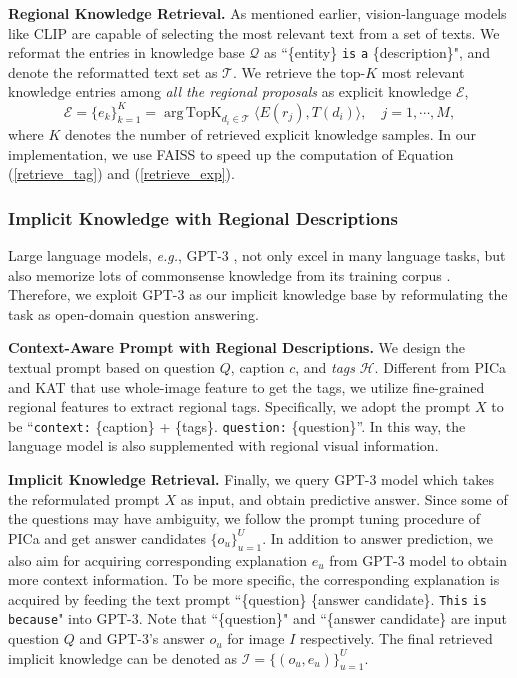 \documentclass{article}
\DeclareMathOperator*{\argtopk}{arg\,TopK}
\begin{document}
\textbf{Regional Knowledge Retrieval. } 
As mentioned earlier, vision-language models like CLIP are capable of selecting the most relevant text from a set of texts. We reformat the entries in knowledge base $\mathcal{Q}$ as ``\{entity\} \texttt{is} \texttt{a} \{description\}", and denote the reformatted text set as $\mathcal{T}$. 
We retrieve the top-$K$ most relevant knowledge entries among \emph{all the regional proposals} as explicit knowledge $\mathcal{E}$,  
\begin{equation}
    \label{retrieve_exp}
     \mathcal{E} = \{e_{k}\}_{k=1}^K= \argtopk_{d_i\in \mathcal{T}}  \langle E(r_j), T(d_i) \rangle, \quad j=1, \cdots, M,
\end{equation}
where $K$ denotes the number of retrieved explicit knowledge samples. In our implementation, we use FAISS \cite{johnson2019billion} to speed up the computation of Equation (\ref{retrieve_tag}) and (\ref{retrieve_exp}).

\subsubsection{Implicit Knowledge with Regional Descriptions}
Large language models, \textit{e.g.}, GPT-3 \cite{brown2020language}, not only excel in many language tasks, but also memorize lots of commonsense knowledge from its training corpus \cite{yang2021empirical}. Therefore, we exploit GPT-3 \cite{brown2020language} as our implicit knowledge base by reformulating the task as open-domain question answering.

\textbf{Context-Aware Prompt with Regional Descriptions. }  We design the textual prompt based on question $Q$, caption $c$, and \emph{tags} $\mathcal{H}$. Different from PICa \cite{yang2021empirical} and KAT \cite{gui2021kat} that use whole-image feature to get the tags, we utilize fine-grained regional features to extract regional tags. Specifically, we adopt the prompt $X$ to be ``\texttt{context:} \{caption\} + \{tags\}. \texttt{question:} \{question\}''. In this way, the language model is also supplemented with regional visual information.


\textbf{Implicit Knowledge Retrieval. } Finally, we query GPT-3 model \cite{brown2020language} which takes the reformulated prompt $X$ as input, and obtain predictive answer. Since some of the questions may have ambiguity, we follow the prompt tuning procedure of PICa \cite{yang2021empirical} and get answer candidates $\{o_u\}_{u=1}^U$. In addition to answer prediction, we also aim for acquiring corresponding explanation $e_{u}$ from GPT-3 model to obtain more context information. To be more specific, the corresponding explanation is acquired by feeding the text prompt ``\{question\} \{answer candidate\}. \texttt{This} \texttt{is} \texttt{because}" into GPT-3. Note that ``\{question\}" and ``\{answer candidate\} are input question $Q$ and GPT-3's  answer $o_u$ for image $I$ respectively. The final retrieved implicit knowledge can be denoted as $\mathcal{I} = \{(o_u, e_u)\}_{u=1}^U$. 
\end{document}
